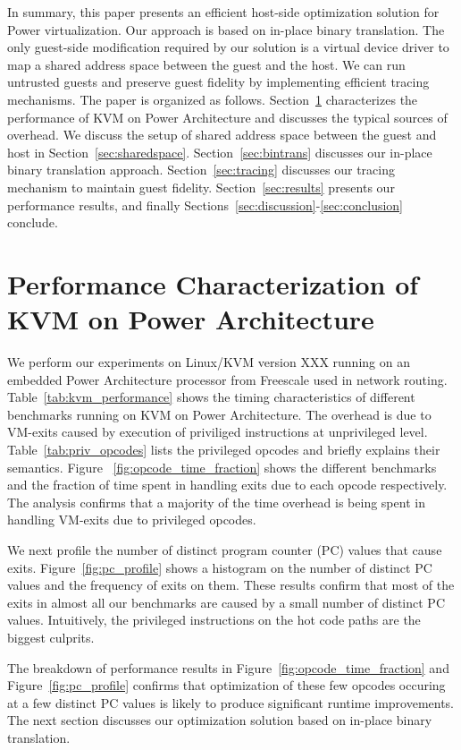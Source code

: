 \documentclass[10pt,twocolumn]{article}
\begin{document}
In summary, this paper presents an efficient host-side optimization solution for
Power virtualization. Our approach is based on in-place binary translation.
The only guest-side modification required by our solution is a virtual
device driver to map a shared address space between the guest and the host.
We can run untrusted guests and preserve guest fidelity by implementing efficient
tracing mechanisms.
The paper is organized as
follows. Section~\ref{sec:performance_char} characterizes the performance of
KVM on Power Architecture and discusses the typical sources of overhead.
We discuss the setup of shared address space between the guest and host
in Section~\ref{sec:sharedspace}.
Section~\ref{sec:bintrans} discusses our in-place binary translation approach.
Section~\ref{sec:tracing} discusses our tracing mechanism to maintain guest fidelity.
Section~\ref{sec:results} presents our performance results, and
finally Sections~\ref{sec:discussion}-\ref{sec:conclusion} conclude.

\section{Performance Characterization of KVM on Power Architecture}
\label{sec:performance_char}
We perform our experiments on Linux/KVM version XXX running on an
embedded Power Architecture processor from Freescale used in network
routing.
Table~\ref{tab:kvm_performance} shows the timing characteristics of
different benchmarks running on KVM on Power Architecture. The
overhead is due to VM-exits caused by execution of priviliged instructions
at unprivileged level. Table~\ref{tab:priv_opcodes} lists the privileged
opcodes and briefly explains their semantics.
Figure ~\ref{fig:opcode_time_fraction} shows
the different benchmarks and the fraction of time spent in handling
exits due to each opcode respectively. The analysis confirms that a
majority of the time overhead is being spent in handling VM-exits due
to privileged opcodes.

We next profile the number of distinct program counter (PC) values that
cause exits. Figure~\ref{fig:pc_profile} shows a histogram on the number
of distinct PC values and the frequency of exits on them. These results
confirm that most of the exits in almost all our benchmarks are caused
by a small number of distinct PC values. Intuitively, the privileged
instructions on the hot code paths are the biggest culprits.

The breakdown of performance results in Figure~\ref{fig:opcode_time_fraction}
and Figure~\ref{fig:pc_profile} confirms that optimization of these
few opcodes occuring at a few distinct PC values is likely to produce
significant runtime improvements. The next section discusses our
optimization solution based on in-place binary translation.
\end{document}
